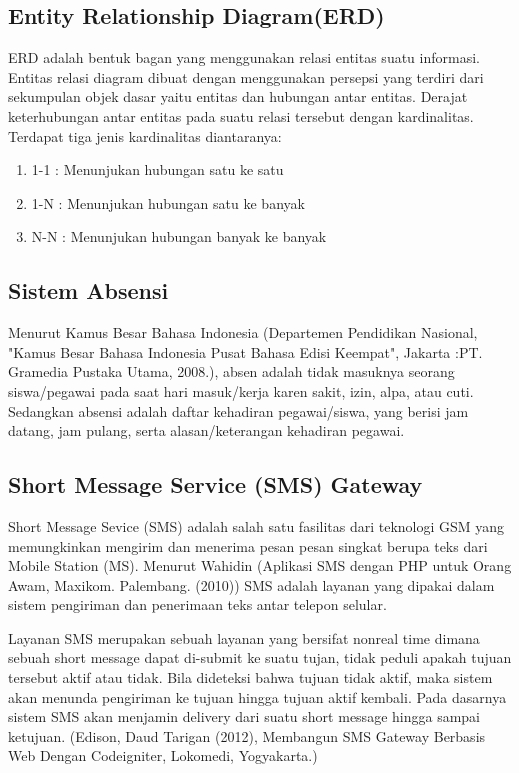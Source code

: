 \documentclass{jtetiproposalskripsi}
\begin{document}
\subsection{Entity Relationship Diagram(ERD)}
ERD adalah bentuk bagan yang menggunakan relasi entitas suatu informasi. Entitas relasi diagram dibuat dengan menggunakan persepsi yang terdiri dari sekumpulan objek dasar yaitu entitas dan hubungan antar entitas. Derajat keterhubungan antar entitas pada suatu relasi tersebut dengan kardinalitas. Terdapat tiga jenis kardinalitas diantaranya:
\begin{enumerate}
\item 1-1 : Menunjukan hubungan satu ke satu
\item 1-N : Menunjukan hubungan satu ke banyak
\item N-N : Menunjukan hubungan banyak ke banyak
\end{enumerate}

\subsection{Sistem Absensi}
Menurut Kamus Besar Bahasa Indonesia (Departemen Pendidikan Nasional, "Kamus Besar Bahasa Indonesia Pusat Bahasa Edisi Keempat", Jakarta :PT. Gramedia Pustaka Utama, 2008.), absen adalah tidak masuknya seorang siswa/pegawai pada saat hari masuk/kerja karen sakit, izin, alpa, atau cuti. Sedangkan absensi adalah daftar kehadiran pegawai/siswa, yang berisi jam datang, jam pulang, serta alasan/keterangan kehadiran pegawai.

\subsection{Short Message Service (SMS) Gateway}
Short Message Sevice (SMS) adalah salah satu fasilitas dari teknologi GSM yang memungkinkan mengirim dan menerima pesan pesan singkat berupa teks dari Mobile Station (MS). Menurut Wahidin (Aplikasi SMS dengan PHP untuk Orang Awam, Maxikom. Palembang. (2010)) SMS adalah layanan yang dipakai dalam sistem pengiriman dan penerimaan teks antar telepon selular.

Layanan SMS merupakan sebuah layanan yang bersifat nonreal time dimana sebuah short message dapat di-submit ke suatu tujan, tidak peduli apakah tujuan tersebut aktif atau tidak. Bila dideteksi bahwa tujuan tidak aktif, maka sistem akan menunda pengiriman ke tujuan hingga tujuan aktif kembali. Pada dasarnya sistem SMS akan menjamin delivery dari suatu short message hingga sampai ketujuan. (Edison, Daud Tarigan (2012), Membangun SMS Gateway Berbasis Web Dengan Codeigniter, Lokomedi, Yogyakarta.)
\end{document}
